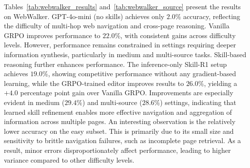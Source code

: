 Tables~\ref{tab:webwalker_results} and~\ref{tab:webwalker_source} present the results on WebWalker. GPT-4o-mini (no skills) achieves only $2.0\%$ accuracy, reflecting the difficulty of multi-hop web navigation and cross-page reasoning. Vanilla GRPO improves performance to $22.0\%$, with consistent gains across difficulty levels. However, performance remains constrained in settings requiring deeper information synthesis, particularly in medium and multi-source tasks. Skill-based reasoning further enhances performance. The inference-only Skill-R1 setup achieves $19.0\%$, showing competitive performance without any gradient-based learning, while the GRPO-trained editor improves results to $26.0\%$, yielding a $+4.0$ percentage point gain over Vanilla GRPO. Improvements are especially evident in medium ($29.4\%$) and multi-source ($28.6\%$) settings, indicating that learned skill refinement enables more effective navigation and aggregation of information across multiple pages. An interesting observation is the relatively lower accuracy on the easy subset. This is primarily due to its small size and sensitivity to brittle navigation failures, such as incomplete page retrieval. As a result, minor errors disproportionately affect performance, leading to higher variance compared to other difficulty levels.



